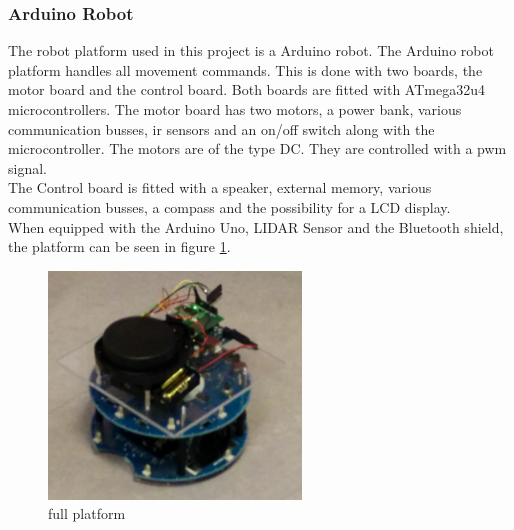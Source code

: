 \subsubsection{Arduino Robot}
The robot platform used in this project is a Arduino robot\cite{ArduinoRobot}. The Arduino robot platform handles all movement commands. This is done with two boards, the motor board and the control board. 
Both boards are fitted with ATmega32u4 microcontrollers. The motor board has two motors, a power bank, various communication busses, ir sensors and an on/off switch along with the microcontroller. 
The motors are of the type DC. They are controlled with a pwm signal.\\
The Control board is fitted with a speaker, external memory, various communication busses, a compass and the possibility for a LCD display.\\
When equipped with the Arduino Uno, LIDAR Sensor and the Bluetooth shield, the platform can be seen in figure \ref{fig:fullplatform}.
\begin{figure}[H]
\centering
\includegraphics[width=0.6\textwidth]{billeder/fullplatform}
\caption{full platform}
\label{fig:fullplatform}
\end{figure}



 
